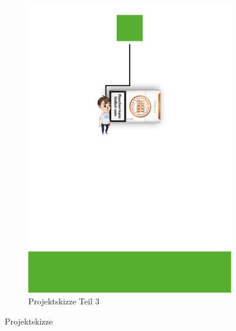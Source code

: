 \begin{figure}[H]
\begin{subfigure}[b]{0.3\textwidth}
        \includegraphics[width=\textwidth]{assets/skizze3.png}
        \caption{Projektskizze Teil 3}
        \label{fig:skizze3}
    \end{subfigure}
    \caption{Projektskizze}\label{fig:conc_skizze}
\end{figure}